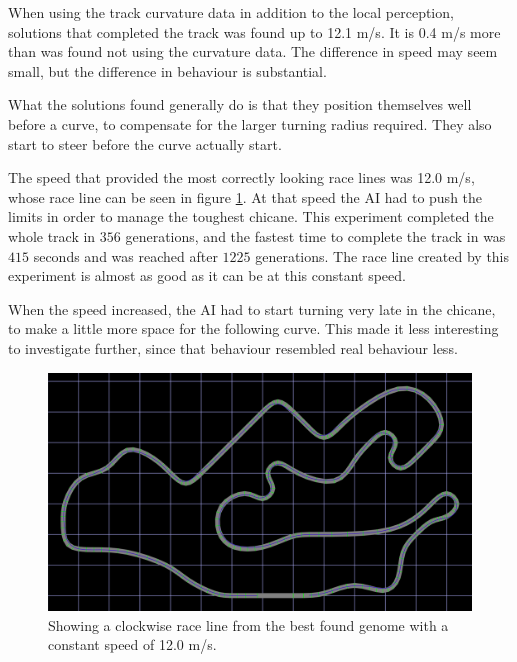 

When using the track curvature data in addition to the local perception, solutions that completed the track was found up to 12.1 m/s. It is 0.4 m/s more than was found not using the curvature data. The difference in speed may seem small, but the difference in behaviour is substantial.

What the solutions found generally do is that they position themselves well before a curve, to compensate for the larger turning radius required. They also start to steer before the curve actually start.

The speed that provided the most correctly looking race lines was 12.0 m/s, whose race line can be seen in figure \ref{fig:constantspeedline}. At that speed the AI had to push the limits in order to manage the toughest chicane. This experiment completed the whole track in $356$ generations, and the fastest time to complete the track in was $415$ seconds and was reached after $1225$ generations. The race line created by this experiment is almost as good as it can be at this constant speed. 

When the speed increased, the AI had to start turning very late in the chicane, to make a little more space for the following curve. This made it less interesting to investigate further, since that behaviour resembled real behaviour less.

\begin{figure}[h]
\includegraphics[width=\textwidth]{report/images/fixed_curve_data}
\centering
\caption{Showing a clockwise race line from the best found genome with a constant speed of 12.0 m/s.}
\label{fig:constantspeedline}
\end{figure}

